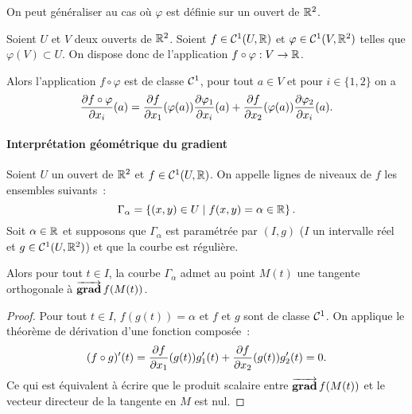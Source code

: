 %
On peut généraliser au cas où \(\varphi\) est définie sur un ouvert de 
\(\mathbb{R}^2\).
%
\begin{theo}
  Soient \(U\) et \(V\) deux ouverts de \(\mathbb{R}^2\). Soient \(f \in 
  \mathcal{C}^{1}(U, \mathbb{R})\) et \(\varphi \in \mathcal{C}^{1}(V, \mathbb{R}^2)\) telles que 
  \(\varphi(V) \subset U\). On dispose donc de l'application \(f \circ 
  \varphi : V \rightarrow \mathbb{R}\). 

  Alors l'application \(f\circ \varphi\) est de classe \(\mathcal{C}^{1}\), 
  pour tout \(a \in V\) et pour \(i \in \{1, 2\}\) on a
  \begin{equation}
    \dfrac{\partial{} f\circ \varphi}{\partial{} x_i}(a) = 
    \dfrac{\partial{} f}{\partial{} x_1}(\varphi(a))\dfrac{\partial{} \varphi_1}{\partial{} x_i}(a) + 
    \dfrac{\partial{} f}{\partial{} x_2}(\varphi(a))\dfrac{\partial{} \varphi_2}{\partial{} x_i}(a).
  \end{equation}
\end{theo}

\paragraph{Interprétation géométrique du gradient}

\begin{prop}
  Soient \(U\) un ouvert de \(\mathbb{R}^2\) et \(f \in \mathcal{C}^{1}(U, \mathbb{R})\). On 
  appelle lignes de niveaux de \(f\) les ensembles suivants~:
  \begin{equation}
    \Gamma_\alpha = \left\{(x,y) \in U\mathrel{}\middle|\mathrel{}f(x,y)=\alpha \in \mathbb{R}\right\}.
  \end{equation}
  Soit \(\alpha \in \mathbb{R}\) et supposons que \(\Gamma_\alpha\) est 
  paramétrée par \((I, g)\) (\(I\) un intervalle réel et \(g \in 
  \mathcal{C}^{1}(U, \mathbb{R}^2)\)) et que la courbe est régulière. 

  Alors pour tout \(t \in I\), la courbe \(\Gamma_\alpha\) admet au 
  point \(M(t)\) une tangente orthogonale à \(\operatorname{\overrightarrow{\mathbf{grad}}} f(M(t))\).
\end{prop}
\begin{proof}
  Pour tout \(t \in I\), \(f(g(t))=\alpha\) et \(f\) et \(g\) sont de 
  classe \(\mathcal{C}^{1}\). On applique le théorème de dérivation d'une 
  fonction composée~:
  \begin{equation}
    (f \circ g)'(t) = \dfrac{\partial{} f}{\partial{} x_1}(g(t))g_1'(t) + 
    \dfrac{\partial{} f}{\partial{} x_2}(g(t))g_2'(t) = 0.
  \end{equation}
  Ce qui est équivalent à écrire que le produit scalaire entre \(\operatorname{\overrightarrow{\mathbf{grad}}} 
  f(M(t))\) et le vecteur directeur de la tangente en \(M\) est nul.
\end{proof}

